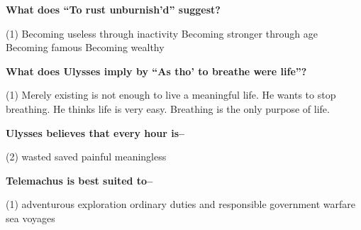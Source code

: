 \documentclass[12pt,a4paper]{exam}
\begin{document}
\begin{questions}
	\begin{minipage}{\textwidth}
		\question \textbf{What does ``To rust unburnish'd'' suggest?}

		\begin{tasks}(1)
			\task Becoming useless through inactivity
			\task Becoming stronger through age
			\task Becoming famous
			\task Becoming wealthy
		\end{tasks}
	\end{minipage}


	\begin{minipage}{\textwidth}
		\question \textbf{What does Ulysses imply by ``As tho' to breathe were life''?}

		\begin{tasks}(1)
			\task Merely existing is not enough to live a meaningful life.
			\task He wants to stop breathing.
			\task He thinks life is very easy.
			\task Breathing is the only purpose of life.
		\end{tasks}
	\end{minipage}


	\begin{minipage}{\textwidth}
		\question \textbf{Ulysses believes that every hour is--}

		\begin{tasks}(2)
			\task wasted
			\task saved
			\task painful
			\task meaningless
		\end{tasks}
	\end{minipage}


	\begin{minipage}{\textwidth}
		\question \textbf{Telemachus is best suited to--}

		\begin{tasks}(1)
			\task adventurous exploration
			\task ordinary duties and responsible government
			\task warfare
			\task sea voyages
		\end{tasks}
	\end{minipage}



\end{questions}
\end{document}
